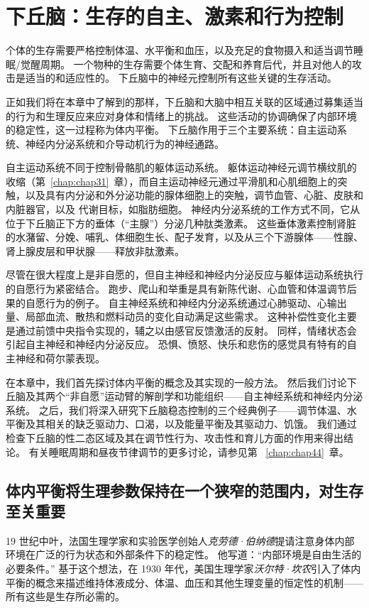 \chapter{下丘脑：生存的自主、激素和行为控制} \label{chap:chap41}

个体的生存需要严格控制体温、水平衡和血压，以及充足的食物摄入和适当调节睡眠/觉醒周期。
一个物种的生存需要个体生育、交配和养育后代，并且对他人的攻击是适当的和适应性的。
下丘脑中的神经元控制所有这些关键的生存活动。


正如我们将在本章中了解到的那样，下丘脑和大脑中相互关联的区域通过募集适当的行为和生理反应来应对身体和情绪上的挑战。
这些活动的协调确保了内部环境的稳定性，这一过程称为体内平衡。
下丘脑作用于三个主要系统：自主运动系统、神经内分泌系统和介导动机行为的神经通路。


自主运动系统不同于控制骨骼肌的躯体运动系统。 躯体运动神经元调节横纹肌的收缩（第~\ref{chap:chap31}~章），而自主运动神经元通过平滑肌和心肌细胞上的突触，以及具有内分泌和外分泌功能的腺体细胞上的突触，调节血管、心脏、皮肤和内脏器官，以及 代谢目标，如脂肪细胞。
神经内分泌系统的工作方式不同，它从位于下丘脑正下方的垂体（“主腺”）分泌几种肽类激素。
这些垂体激素控制肾脏的水潴留、分娩、哺乳、体细胞生长、配子发育，以及从三个下游腺体——性腺、肾上腺皮层和甲状腺——释放非肽激素。


尽管在很大程度上是非自愿的，但自主神经和神经内分泌反应与躯体运动系统执行的自愿行为紧密结合。
跑步、爬山和举重是具有新陈代谢、心血管和体温调节后果的自愿行为的例子。
自主神经系统和神经内分泌系统通过心肺驱动、心输出量、局部血流、散热和燃料动员的变化自动满足这些需求。
这种补偿性变化主要是通过前馈中央指令实现的，辅之以由感官反馈激活的反射。
同样，情绪状态会引起自主神经和神经内分泌反应。
恐惧、愤怒、快乐和悲伤的感觉具有特有的自主神经和荷尔蒙表现。


在本章中，我们首先探讨体内平衡的概念及其实现的一般方法。
然后我们讨论下丘脑及其两个“非自愿”运动臂的解剖学和功能组织——自主神经系统和神经内分泌系统。
之后，我们将深入研究下丘脑稳态控制的三个经典例子——调节体温、水平衡及其相关的缺乏驱动力、口渴，以及能量平衡及其驱动力、饥饿。
我们通过检查下丘脑的性二态区域及其在调节性行为、攻击性和育儿方面的作用来得出结论。
有关睡眠周期和昼夜节律调节的更多讨论，请参见第 ~\ref{chap:chap44}~章。



\section{体内平衡将生理参数保持在一个狭窄的范围内，对生存至关重要}

19 世纪中叶，法国生理学家和实验医学创始人\textit{克劳德·伯纳德}提请注意身体内部环境在广泛的行为状态和外部条件下的稳定性。
他写道：“内部环境是自由生活的必要条件。” 
基于这个想法，在 1930 年代，美国生理学家\textit{沃尔特·坎农}引入了体内平衡的概念来描述维持体液成分、体温、血压和其他生理变量的恒定性的机制——所有这些是生存所必需的。



